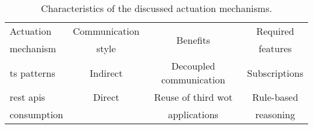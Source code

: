 
\begin{table}[htbp]
  \caption{Characteristics of the discussed actuation mechanisms.}
  \begin{center}
    \footnotesize
    \begin{tabular}{lccc}
      \hline
      Actuation &
      Communication & %
      \multirow{2}{*}{Benefits} &
      Required \\
      mechanism &
      style &
      ~ &
      features \\
      \hline
      \ac{ts} patterns & Indirect & Decoupled communication & Subscriptions \\[0.2cm]
      \ac{rest} \acp{api} & Direct & Reuse of third \ac{wot} & Rule-based \\ %
      consumption & & applications & reasoning \\ %
      \hline
    \end{tabular}
  \end{center}
  \label{tab:actuation_mechanisms}
\end{table}